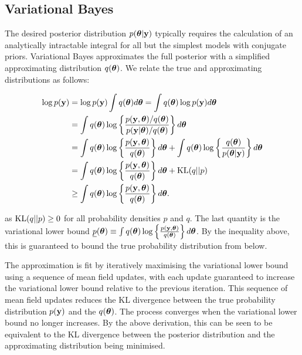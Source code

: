 \documentclass{amsart}[12pt]
\begin{document}
\subsection{Variational Bayes}

The desired posterior distribution $p({\boldsymbol \theta} | {\bf y})$ typically requires the calculation of an analytically
intractable integral for all but the simplest models with conjugate priors. Variational Bayes approximates the
full posterior with a simplified approximating distribution $q({\boldsymbol \theta})$. We relate the true and
approximating distributions as follows:

\begin{align*}
	\log p({\bf y}) & = \log p({\bf y}) \int q({\boldsymbol \theta}) d {\boldsymbol \theta} = \int q({\boldsymbol \theta}) \log p({\bf y}) d {\boldsymbol \theta}                                    \\
	            & = \int q({\boldsymbol \theta}) \log \left\{ \frac{p({\bf y}, {\boldsymbol \theta}) / q({\boldsymbol \theta})}{p({\bf y}|{\boldsymbol \theta}) / q({\boldsymbol \theta})} \right\} d {\boldsymbol \theta} \\
	            & = \int q({\boldsymbol \theta}) \log\left\{ \frac{p({\bf y}, {\boldsymbol \theta})}{q({\boldsymbol \theta})} \right\} d {\boldsymbol \theta} +                              
	\int q({\boldsymbol \theta}) \log\left\{ \frac{q({\boldsymbol \theta})}{p({\boldsymbol \theta}|{\bf y})} \right\} d {\boldsymbol \theta} \\
	            & = \int q({\boldsymbol \theta}) \log\left\{ \frac{p({\bf y}, {\boldsymbol \theta})}{q({\boldsymbol \theta})} \right\} d {\boldsymbol \theta} +                              
	\text{KL}(q||p) \\
	            & \geq \int q({\boldsymbol \theta}) \log\left\{ \frac{p({\bf y}, {\boldsymbol \theta})}{q({\boldsymbol \theta})} \right\} d {\boldsymbol \theta}.                            
\end{align*}

as $\text{KL}(q||p) \geq 0$ for all probability densities $p$ and $q$. The last quantity is the variational lower
bound $\underline{p}({\boldsymbol \theta}) \equiv \int q({\boldsymbol \theta}) \log\left\{ \frac{p({\bf y}, {\boldsymbol \theta})}{q({\boldsymbol \theta})} \right\}
d{\boldsymbol \theta}$. By the inequality above, this is guaranteed to bound the true probability distribution from below.

The approximation is fit by iteratively maximising the variational lower bound using a sequence of mean field
updates, with each update guaranteed to increase the variational lower bound relative to the previous
iteration. This sequence of mean field updates reduces the KL divergence between the true probability
distribution $p({\bf y})$ and the $q({\boldsymbol \theta})$. The process converges when the variational lower bound no longer
increases. By the above derivation, this can be seen to be equivalent to the KL divergence between the posterior distribution and the approximating distribution being minimised.
\end{document}
